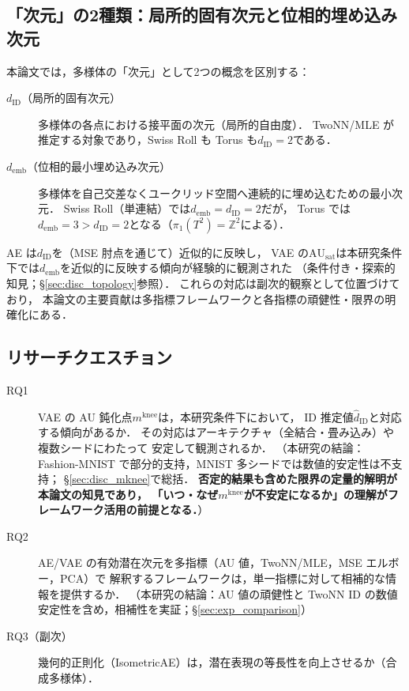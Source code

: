 \documentclass[11pt,a4paper]{jsarticle}
\newcommand{\dID}{d_{\mathrm{ID}}}
\newcommand{\AUsat}{\mathrm{AU}_{\mathrm{sat}}}
\newcommand{\mknee}{m^{\mathrm{knee}}}
\newcommand{\demb}{d_{\mathrm{emb}}}
\begin{document}
\subsection{「次元」の2種類：局所的固有次元と位相的埋め込み次元}\label{sec:intro_dim}

本論文では，多様体の「次元」として2つの概念を区別する：

\begin{description}
  \item[$\dID$（局所的固有次元）]
        多様体の各点における接平面の次元（局所的自由度）．
        TwoNN/MLE が推定する対象であり，Swiss Roll も Torus も$\dID = 2$である．
  \item[$\demb$（位相的最小埋め込み次元）]
        多様体を自己交差なくユークリッド空間へ連続的に埋め込むための最小次元．
        Swiss Roll（単連結）では$\demb = \dID = 2$だが，
        Torus では$\demb = 3 > \dID = 2$となる（$\pi_1(T^2) = \mathbb{Z}^2$による）．
\end{description}

AE は$\dID$を（MSE 肘点を通じて）近似的に反映し，
VAE の$\AUsat$は本研究条件下では$\demb$を近似的に反映する傾向が経験的に観測された
（条件付き・探索的知見；§\ref{sec:disc_topology}参照）．
これらの対応は副次的観察として位置づけており，
本論文の主要貢献は多指標フレームワークと各指標の頑健性・限界の明確化にある．

\subsection{リサーチクエスチョン}\label{sec:intro_rq}

\begin{description}
  \item[RQ1] VAE の AU 鈍化点$\mknee$は，本研究条件下において，
             ID 推定値$\hat{d}_\mathrm{ID}$と対応する傾向があるか．
             その対応はアーキテクチャ（全結合・畳み込み）や複数シードにわたって
             安定して観測されるか．
             （本研究の結論：Fashion-MNIST で部分的支持，MNIST 多シードでは数値的安定性は不支持；
             §\ref{sec:disc_mknee}で総括．
             \textbf{否定的結果も含めた限界の定量的解明が本論文の知見であり，
             「いつ・なぜ$\mknee$が不安定になるか」の理解がフレームワーク活用の前提となる．}）
  \item[RQ2] AE/VAE の有効潜在次元を多指標（AU 値，TwoNN/MLE，MSE エルボー，PCA）で
             解釈するフレームワークは，単一指標に対して相補的な情報を提供するか．
             （本研究の結論：AU 値の頑健性と TwoNN ID の数値安定性を含め，相補性を実証；§\ref{sec:exp_comparison}）
  \item[RQ3（副次）] 幾何的正則化（IsometricAE）は，潜在表現の等長性を向上させるか（合成多様体）．
\end{description}
\end{document}
